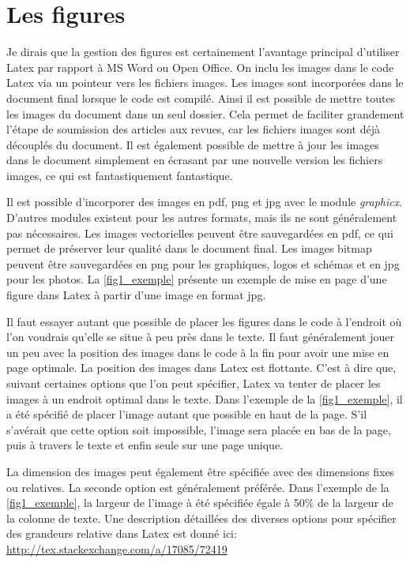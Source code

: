 \documentclass[exemple_master.tex]{subfiles}
\begin{document}
\section{Les figures}

Je dirais que la gestion des figures est certainement l'avantage principal d'utiliser Latex par rapport à MS Word ou Open Office. On inclu les images dans le code Latex via un pointeur vers les fichiers images. Les images sont incorporées dans le document final lorsque le code est compilé. Ainsi il est possible de mettre toutes les images du document dans un seul dossier. Cela permet de faciliter grandement l'étape de soumission des articles aux revues, car les fichiers images sont déjà découplés du document. Il est également possible de mettre à jour les images dans le document simplement en écrasant par une nouvelle version les fichiers images, ce qui est fantastiquement fantastique.

Il est possible d'incorporer des images en pdf, png et jpg avec le module \emph{graphicx}. D'autres modules existent pour les autres formats, mais ils ne sont généralement pas nécessaires. Les images vectorielles peuvent être sauvegardées en pdf, ce qui permet de préserver leur qualité dans le document final. Les images bitmap peuvent être sauvegardées en png pour les graphiques, logos et schémas et en jpg pour les photos. La \cref{fig1_exemple} présente un exemple de mise en page d'une figure dans Latex à partir d'une image en format jpg.

Il faut essayer autant que possible de placer les figures dans le code à l'endroit où l'on voudrais qu'elle se situe à peu près dans le texte. Il faut généralement jouer un peu avec la position des images dans le code à la fin pour avoir une mise en page optimale. La position des images dans Latex est flottante. C'est à dire que, suivant certaines options que l'on peut spécifier, Latex va tenter de placer les images à un endroit optimal dans le texte. Dans l'exemple de la \cref{fig1_exemple}, il a été spécifié de placer l'image autant que possible en haut de la page. S'il s'avérait que cette option soit impossible, l'image sera placée en bas de la page, puis à travers le texte et enfin seule sur une page unique.

La dimension des images peut également être spécifiée avec des dimensions fixes ou relatives. La seconde option est généralement préférée. Dans l'exemple de la \cref{fig1_exemple}, la largeur de l'image à été spécifiée égale à 50\% de la largeur de la colonne de texte. Une description détaillées des diverses options pour spécifier des grandeurs relative dans Latex est donné ici: \url{http://tex.stackexchange.com/a/17085/72419}
\end{document}
